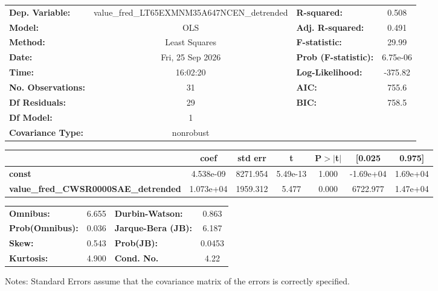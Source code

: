 \begin{center}
\begin{tabular}{lclc}
\toprule
\textbf{Dep. Variable:}                      & value\_fred\_LT65EXMNM35A647NCEN\_detrended & \textbf{  R-squared:         } &     0.508   \\
\textbf{Model:}                              &                     OLS                     & \textbf{  Adj. R-squared:    } &     0.491   \\
\textbf{Method:}                             &                Least Squares                & \textbf{  F-statistic:       } &     29.99   \\
\textbf{Date:}                               &               Fri, 25 Sep 2026              & \textbf{  Prob (F-statistic):} &  6.75e-06   \\
\textbf{Time:}                               &                   16:02:20                  & \textbf{  Log-Likelihood:    } &   -375.82   \\
\textbf{No. Observations:}                   &                        31                   & \textbf{  AIC:               } &     755.6   \\
\textbf{Df Residuals:}                       &                        29                   & \textbf{  BIC:               } &     758.5   \\
\textbf{Df Model:}                           &                         1                   & \textbf{                     } &             \\
\textbf{Covariance Type:}                    &                  nonrobust                  & \textbf{                     } &             \\
\bottomrule
\end{tabular}
\begin{tabular}{lcccccc}
                                             & \textbf{coef} & \textbf{std err} & \textbf{t} & \textbf{P$> |$t$|$} & \textbf{[0.025} & \textbf{0.975]}  \\
\midrule
\textbf{const}                               &    4.538e-09  &     8271.954     &  5.49e-13  &         1.000        &    -1.69e+04    &     1.69e+04     \\
\textbf{value\_fred\_CWSR0000SAE\_detrended} &    1.073e+04  &     1959.312     &     5.477  &         0.000        &     6722.977    &     1.47e+04     \\
\bottomrule
\end{tabular}
\begin{tabular}{lclc}
\textbf{Omnibus:}       &  6.655 & \textbf{  Durbin-Watson:     } &    0.863  \\
\textbf{Prob(Omnibus):} &  0.036 & \textbf{  Jarque-Bera (JB):  } &    6.187  \\
\textbf{Skew:}          &  0.543 & \textbf{  Prob(JB):          } &   0.0453  \\
\textbf{Kurtosis:}      &  4.900 & \textbf{  Cond. No.          } &     4.22  \\
\bottomrule
\end{tabular}
\end{center}

Notes: \newline
 [1] Standard Errors assume that the covariance matrix of the errors is correctly specified.